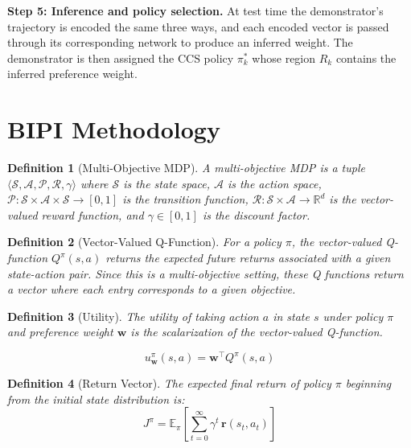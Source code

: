 \documentclass[11pt]{article}
\newtheorem{definition}{Definition}
\begin{document}
\textbf{Step 5: Inference and policy selection.} At test time the demonstrator's trajectory is encoded the same three ways, and each encoded vector is passed through its corresponding network to produce an inferred weight. The demonstrator is then assigned the CCS policy $\pi^*_k$ whose region $R_k$ contains the inferred preference weight.

\newpage
\section{BIPI Methodology}


\begin{definition}[Multi-Objective MDP]
A multi-objective MDP is a tuple $\langle \mathcal{S}, \mathcal{A}, \mathcal{P}, \bm{\mathcal{R}}, \gamma \rangle$ where $\mathcal{S}$ is the state space, $\mathcal{A}$ is the action space, $\mathcal{P}: \mathcal{S} \times \mathcal{A} \times \mathcal{S} \to [0,1]$ is the transition function, $\bm{\mathcal{R}}: \mathcal{S} \times \mathcal{A} \to \mathbb{R}^d$ is the vector-valued reward function, and $\gamma \in [0,1]$ is the discount factor.
\end{definition}

\begin{definition}[Vector-Valued Q-Function]
For a policy $\pi$, the vector-valued Q-function $Q^{\pi}(s, a)$ returns the expected future returns associated with a given state-action pair. Since this is a multi-objective setting, these Q functions return a vector where each entry corresponds to a given objective. 
\end{definition}

\begin{definition}[Utility]
The utility of taking action $a$ in state $s$ under policy $\pi$ and preference weight $\mathbf{w}$ is the scalarization of the vector-valued Q-function.

\begin{equation}
    u_{\mathbf{w}}^{\pi}(s, a) = \mathbf{w}^\top Q^{\pi}(s, a)
\end{equation}
\end{definition}

\begin{definition}[Return Vector]
The expected final return of policy $\pi$ beginning from the initial state distribution is:
\begin{equation}
    J^{\pi} = \mathbb{E}_{\pi}\!\left[\sum_{t=0}^{\infty} \gamma^t \, \mathbf{r}(s_t, a_t)\right]
\end{equation}
\end{definition}
\end{document}
